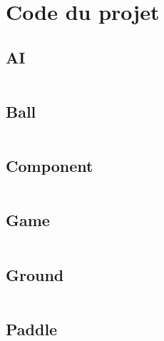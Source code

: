 \section{Code du projet}
\label{sec:code-project}


\subsection{AI}
\label{sec:ai}
\inputminted{python}{src/code/ai.py}

\newpage

\subsection{Ball}
\label{sec:ball}
\inputminted{python}{src/code/ball.py}

\newpage

\subsection{Component}
\label{sec:Component}
\inputminted{python}{src/code/component.py}

\newpage

\subsection{Game}
\label{sec:game}
\inputminted{python}{src/code/game.py}

\newpage

\subsection{Ground}
\label{sec:ground}
\inputminted{python}{src/code/ground.py}

\newpage

\subsection{Paddle}
\label{sec:paddle}
\inputminted{python}{src/code/paddle.py}


